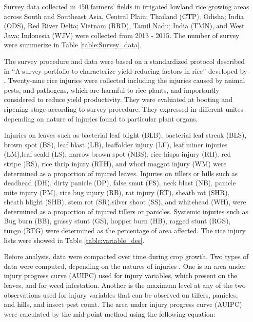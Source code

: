 Survey data collected in 450 farmers’ fields in irrigated lowland rice growing areas across South and Southeast Asia, Central Plain; Thailand (CTP), Odisha; India (ODS), Red River Delta; Vietnam (RRD), Tamil Nadu; India (TMN), and West Java; Indonesia (WJV) were collected from 2013 - 2015. The number of survey were summerize in Table \ref{table:Survey_data}.



The survey procedure and data were based on a standardized protocol described in ``A survey portfolio to characterize yield-reducing factors in rice'' developed by \citet{Savary_2009_Survey}. Twenty-nine rice injuries were collected  including the injuries caused by animal pests, and pathogens, which are harmful to rice plants, and importantly considered to reduce yield productivity. They were evaluated at booting and ripening stage according to survey procedure. They expressed in different unites depending on nature of injuries found to particular plant organs. 

Injuries on leaves such as  bacterial leaf blight (BLB), bacterial leaf streak (BLS), brown spot (BS), leaf blast (LB), leaffolder injury (LF),  leaf miner injuries (LM),leaf scald (LS), narrow brown spot (NBS), rice hispa injury (RH), red stripe (RS), rice thrip injury (RTH), and whorl maggot injury (WM) were determined as a proportion of injured leaves. Injuries on tillers or hills such as deadhead (DH), dirty panicle (DP), false smut (FS),  neck blast (NB), panicle mite injury (PM), rice bug injury (RB), rat injury (RT), sheath rot (SHR), sheath blight (SHB), stem rot (SR),silver shoot (SS), and whitehead (WH), were determined as a proportion of injured tillers or panicles. Systemic injuries such as Bug burn (BB), grassy stunt (GS), hopper burn (HB), ragged stunt (RGS), tungo (RTG) were determined as the percentage of area affected. The rice injury lists were showed in Table \ref{table:variable_des}.



Before analysis, data were compacted over time during crop growth. Two types of data were computed, depending on the natures of injuries \citet{Savary_2009_Survey}. One is an area under injury progress curve (AUIPC) used for injury variables, which present on the leaves, and for weed infestation. Another is the maximum level at any of the two observations used for injury variables that can be observed on tillers, panicles, and hills, and insect pest count. The area under injury progress curve (AUIPC) \citep{Campbell_1990_Introduction} were calculated by the mid-point method using the following equation: 


